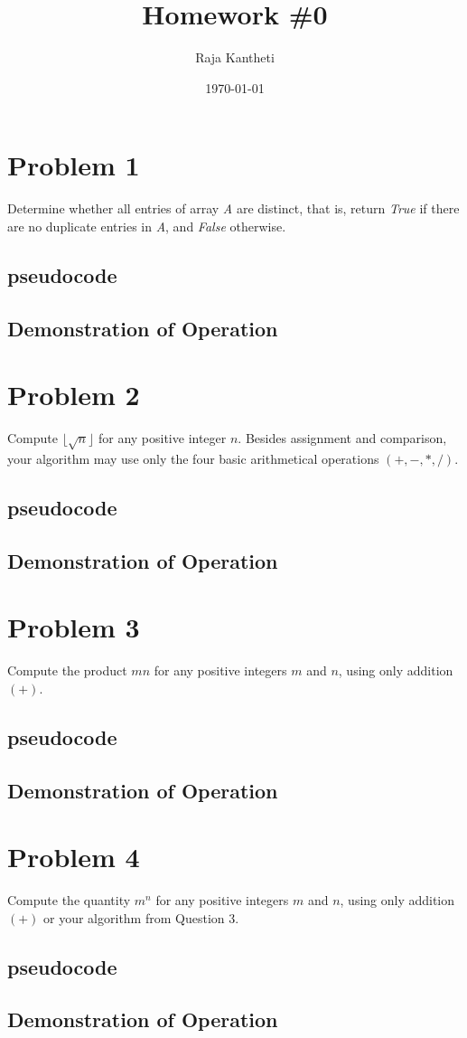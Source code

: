 \documentclass[11pt]{article}
\begin{document}
    \title{Homework \#0}
    \author{Raja Kantheti}
    \date{\today}
    \maketitle
    
    
    \section{Problem 1}
    Determine whether all entries of array \emph{A} are distinct, that is, return \emph{True}
     if there are no duplicate entries in \emph{A}, and \emph{False} otherwise.
     \subsection{pseudocode}
     \subsection{Demonstration of Operation}
    \section{Problem 2}
    Compute $\lfloor\sqrt{n}\rfloor$ for any positive integer $n$.
    Besides assignment and comparison, your algorithm may use only the four basic
    arithmetical operations $(+,-,*,/)$.
    \subsection{pseudocode}
    \subsection{Demonstration of Operation}
    \section{Problem 3}
    Compute the product $mn$ for any positive integers $m$ and $n$, using
    only addition $(+)$.
    \subsection{pseudocode}
    \subsection{Demonstration of Operation}
    \section{Problem 4}
    Compute the quantity $m^n$ for any positive integers $m$ and $n$, using
    only addition $(+)$ or your algorithm from Question 3.
    \subsection{pseudocode}
    \subsection{Demonstration of Operation} 
\end{document}

